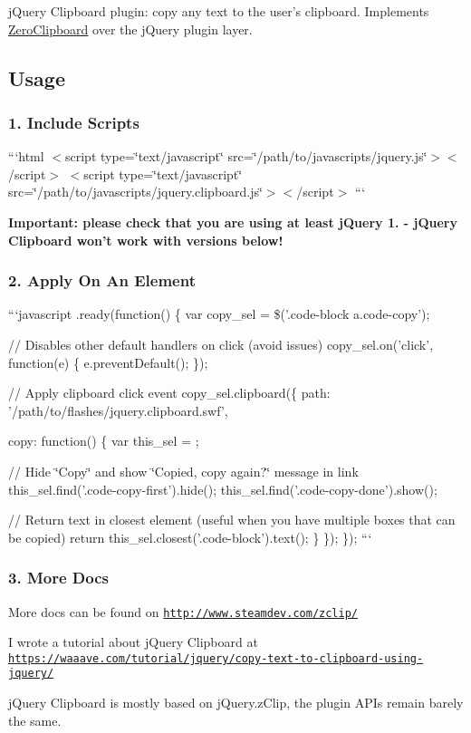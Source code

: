 j\-Query Clipboard plugin\-: copy any text to the user's clipboard. Implements \hyperlink{class_zero_clipboard}{Zero\-Clipboard} over the j\-Query plugin layer.

\subsection*{Usage}

\subsubsection*{1. Include Scripts}

```html $<$script type=\char`\"{}text/javascript\char`\"{} src=\char`\"{}/path/to/javascripts/jquery.\-js\char`\"{}$>$$<$/script$>$ $<$script type=\char`\"{}text/javascript\char`\"{} src=\char`\"{}/path/to/javascripts/jquery.\-clipboard.\-js\char`\"{}$>$$<$/script$>$ ```

{\bfseries Important\-: please check that you are using at least j\-Query 1. -\/ j\-Query Clipboard won't work with versions below!}

\subsubsection*{2. Apply On An Element}

```javascript .ready(function() \{ var copy\-\_\-sel = \$('.code-\/block a.\-code-\/copy');

// Disables other default handlers on click (avoid issues) copy\-\_\-sel.\-on('click', function(e) \{ e.\-prevent\-Default(); \});

// Apply clipboard click event copy\-\_\-sel.\-clipboard(\{ path\-: '/path/to/flashes/jquery.clipboard.\-swf',

copy\-: function() \{ var this\-\_\-sel = ;

// Hide \char`\"{}\-Copy\char`\"{} and show \char`\"{}\-Copied, copy again?\char`\"{} message in link this\-\_\-sel.\-find('.code-\/copy-\/first').hide(); this\-\_\-sel.\-find('.code-\/copy-\/done').show();

// Return text in closest element (useful when you have multiple boxes that can be copied) return this\-\_\-sel.\-closest('.code-\/block').text(); \} \}); \}); ```

\subsubsection*{3. More Docs}

More docs can be found on \href{http://www.steamdev.com/zclip/}{\tt http\-://www.\-steamdev.\-com/zclip/}

I wrote a tutorial about j\-Query Clipboard at \href{https://waaave.com/tutorial/jquery/copy-text-to-clipboard-using-jquery/}{\tt https\-://waaave.\-com/tutorial/jquery/copy-\/text-\/to-\/clipboard-\/using-\/jquery/}

j\-Query Clipboard is mostly based on j\-Query.\-z\-Clip, the plugin A\-P\-Is remain barely the same. 